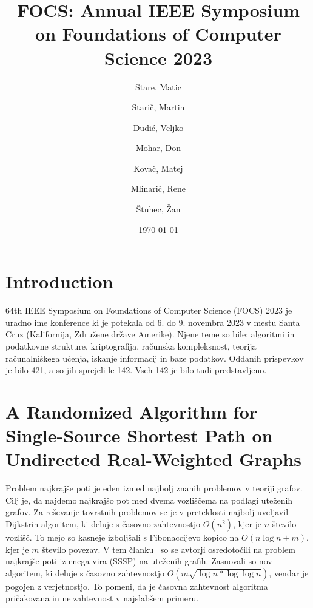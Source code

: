 \documentclass{article}
\title{FOCS: Annual IEEE Symposium on Foundations of Computer Science 2023}
\author{
  Stare, Matic\\
  \and
  Starič, Martin\\
  \and
  Dudić, Veljko\\
  \and
  Mohar, Don
  \and
  Kovač, Matej
  \and
  Mlinarič, Rene
  \and
  Štuhec, Žan
}
\date{\today}
\begin{document}
\maketitle

\tableofcontents
\newpage

\section{Introduction}
64th IEEE Symposium on Foundations of Computer Science (FOCS) 2023 je uradno ime konference ki je potekala od 6. do 9. novembra 2023 v mestu Santa Cruz (Kalifornija, Združene države Amerike). Njene teme so bile: algoritmi in podatkovne strukture, kriptografija, računska kompleksnost, teorija računalniškega učenja, iskanje informacij in baze podatkov. Oddanih prispevkov je bilo 421, a so jih sprejeli le 142. Vseh 142 je bilo tudi predstavljeno.

\section{A Randomized Algorithm for Single-Source Shortest Path on Undirected Real-Weighted Graphs}

Problem najkrajše poti je eden izmed najbolj znanih problemov v teoriji grafov. Cilj je, da najdemo najkrajšo pot med dvema vozliščema na podlagi uteženih grafov. Za reševanje tovrstnih problemov se je v preteklosti najbolj uveljavil Dijkstrin algoritem, ki deluje s časovno zahtevnostjo $O(n^2)$, kjer je $n$ število vozlišč. To mejo so kasneje izboljšali s Fibonaccijevo kopico na $O(n \log n + m)$, kjer je $m$ število povezav. V tem članku~\cite{duan2023randomized} so se avtorji osredotočili na problem najkrajše poti iz enega vira (SSSP) na uteženih grafih. Zasnovali so nov algoritem, ki deluje s časovno zahtevnostjo $O(m \sqrt{\log n * \log \log n})$, vendar je pogojen z verjetnostjo. To pomeni, da je časovna zahtevnost algoritma pričakovana in ne zahtevnost v najslabšem primeru. 
\end{document}
